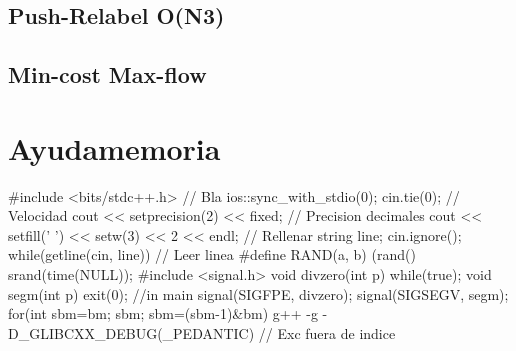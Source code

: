 \subsection{Push-Relabel O(N3)}
\subsection{Min-cost Max-flow}




\section{Ayudamemoria}%
\begin{code}
#include <bits/stdc++.h> // Bla
ios::sync_with_stdio(0); cin.tie(0); // Velocidad
cout << setprecision(2) << fixed; // Precision decimales
cout << setfill(' ') << setw(3) << 2 << endl; // Rellenar
string line; cin.ignore(); while(getline(cin, line)){} // Leer linea
#define RAND(a, b) (rand()%
srand(time(NULL));
#include <signal.h>
void divzero(int p){
	while(true);}
void segm(int p){
	exit(0);}
//in main
signal(SIGFPE, divzero);
signal(SIGSEGV, segm);
for(int sbm=bm; sbm; sbm=(sbm-1)&bm)
g++ -g -D_GLIBCXX_DEBUG(_PEDANTIC) // Exc fuera de indice
\end{code}




